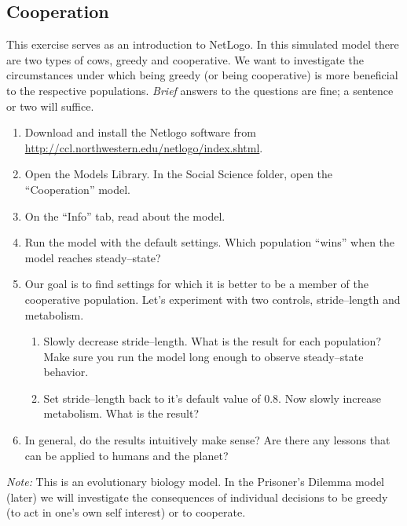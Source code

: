 \documentclass{article}
\begin{document}
\subsection{Cooperation}

This exercise serves as an introduction to NetLogo. In this simulated
model there are two types of cows, greedy and cooperative.  We want to
investigate the circumstances under which being greedy (or being
cooperative) is more beneficial to the respective populations. \emph{Brief}
answers to the questions are fine; a sentence or two will suffice.


\begin{enumerate}
\item Download and install the Netlogo software from\\
  \url{http://ccl.northwestern.edu/netlogo/index.shtml}.
\item Open the Models Library. In the Social Science folder, open the ``Cooperation''
  model.
\item On the ``Info'' tab, read about the model.

\item Run the model with the default settings. Which population ``wins''
  when the model reaches steady--state?
\item Our goal is to find settings for which it is better to be
  a member of the cooperative population. Let's experiment with
  two controls, stride--length and metabolism.
  \begin{enumerate}
  \item Slowly decrease stride--length. What is the result for each population?
    Make sure you run the model long enough to observe steady--state behavior.
  \item Set stride--length back to it's default value of 0.8. Now slowly increase
    metabolism. What is the result?
  \end{enumerate}
\item In general, do the results intuitively make sense? Are there any lessons
  that can be applied to humans and the planet?
  \end{enumerate}

  \emph{Note:} This is an evolutionary biology model. In the
  Prisoner's Dilemma model (later) we will investigate the
  consequences of individual decisions to be greedy (to act in one's
  own self interest) or to cooperate.
\end{document}
